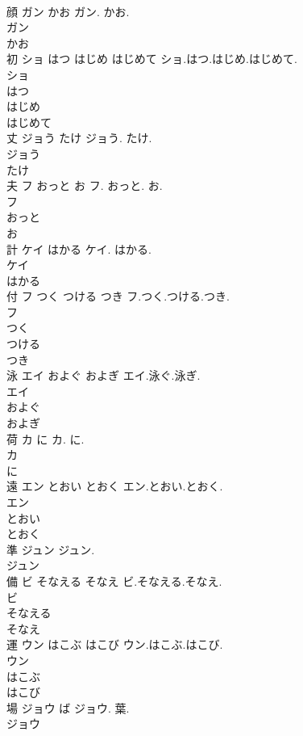\documentclass[8pt]{extreport}
\begin{document}
\begin{CJK}{UTF8}{min}
\\	顔	ガン かお	ガン. かお.	
\\	ガン
\\	かお
\\	初	ショ はつ はじめ はじめて	ショ.はつ.はじめ.はじめて.	
\\	ショ
\\	はつ
\\	はじめ
\\	はじめて
\\	丈	ジョう たけ	ジョう. たけ.	
\\	ジョう
\\	たけ
\\	夫	フ おっと お	フ. おっと. お.	
\\	フ
\\	おっと
\\	お
\\	計	ケイ はかる	ケイ. はかる.	
\\	ケイ
\\	はかる
\\	付	フ つく つける つき	フ.つく.つける.つき.	
\\	フ
\\	つく
\\	つける
\\	つき
\\	泳	エイ およぐ およぎ	エイ.泳ぐ.泳ぎ.	
\\	エイ
\\	およぐ
\\	およぎ
\\	荷	カ に	カ. に.	
\\	カ
\\	に
\\	遠	エン とおい とおく	エン.とおい.とおく.	
\\	エン
\\	とおい
\\	とおく
\\	準	ジュン	ジュン.	
\\	ジュン
\\	備	ビ そなえる そなえ	ビ.そなえる.そなえ.	
\\	ビ
\\	そなえる
\\	そなえ
\\	運	ウン はこぶ はこび	ウン.はこぶ.はこび.	
\\	ウン
\\	はこぶ
\\	はこび
\\	場	ジョウ ば	ジョウ. 葉.	
\\	ジョウ

\end{CJK}
\end{document}
